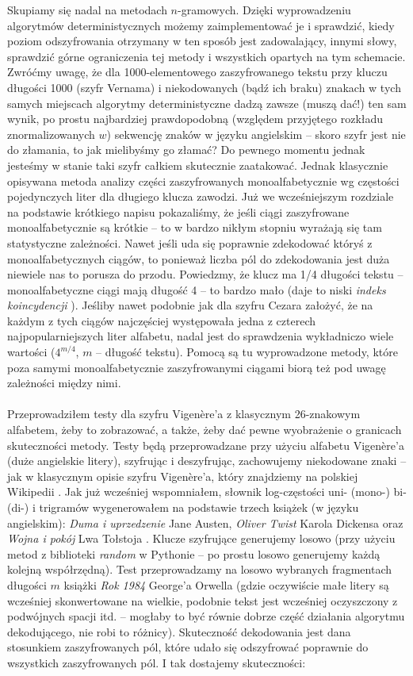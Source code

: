 \documentclass[a4paper]{article}
\theoremstyle{defn}
\theoremstyle{theorem}
\theoremstyle{lemma}
\theoremstyle{cor}
\theoremstyle{fact}
\begin{document}
Skupiamy się nadal na metodach $n$-gramowych. Dzięki wyprowadzeniu algorytmów deterministycznych możemy zaimplementować je i sprawdzić, kiedy poziom odszyfrowania otrzymany w ten sposób jest zadowalający, innymi słowy, sprawdzić górne ograniczenia tej metody i wszystkich opartych na tym schemacie. Zwróćmy uwagę, że dla 1000-elementowego zaszyfrowanego tekstu przy kluczu długości 1000 (szyfr Vernama) i niekodowanych (bądź ich braku) znakach w tych samych miejscach algorytmy deterministyczne dadzą zawsze (muszą dać!) ten sam wynik, po prostu najbardziej prawdopodobną (względem przyjętego rozkładu znormalizowanych $w$) sekwencję znaków w języku angielskim – skoro szyfr jest nie do złamania, to jak mielibyśmy go złamać? Do pewnego momentu jednak jesteśmy w stanie taki szyfr całkiem skutecznie zaatakować. Jednak klasycznie opisywana metoda analizy części zaszyfrowanych monoalfabetycznie wg częstości pojedynczych liter dla długiego klucza zawodzi. Już we wcześniejszym rozdziale na podstawie krótkiego napisu pokazaliśmy, że jeśli ciągi zaszyfrowane monoalfabetycznie są krótkie – to w bardzo nikłym stopniu wyrażają się tam statystyczne zależności. Nawet jeśli uda się poprawnie zdekodować któryś z monoalfabetycznych ciągów, to ponieważ liczba pól do zdekodowania jest duża niewiele nas to porusza do przodu. Powiedzmy, że klucz ma 1/4 długości tekstu – monoalfabetyczne ciągi mają długość 4 – to bardzo mało (daje to niski \textit{indeks koincydencji} \cite{coinc}). Jeśliby nawet podobnie jak dla szyfru Cezara założyć, że na każdym z tych ciągów najczęściej występowała jedna z czterech najpopularniejszych liter alfabetu, nadal jest do sprawdzenia wykładniczo wiele wartości ($4^{m/4}$, $m$ – długość tekstu). Pomocą są tu wyprowadzone metody, które poza samymi monoalfabetycznie zaszyfrowanymi ciągami biorą też pod uwagę zależności między nimi. \\\\
Przeprowadziłem testy dla szyfru Vigenère'a z klasycznym 26-znakowym alfabetem, żeby to zobrazować, a także, żeby dać pewne wyobrażenie o granicach skuteczności metody. Testy będą przeprowadzane przy użyciu alfabetu Vigenère'a (duże angielskie litery), szyfrując i deszyfrując, zachowujemy niekodowane znaki – jak w klasycznym opisie szyfru Vigenère'a, który znajdziemy na polskiej Wikipedii \cite{vigenere}. Jak już wcześniej wspomniałem, słownik log-częstości uni- (mono-) bi- (di-) i trigramów wygenerowałem na podstawie trzech książek (w języku angielskim): \textit{Duma i uprzedzenie} Jane Austen, \textit{Oliver Twist} Karola Dickensa oraz \textit{Wojna i pokój} Lwa Tołstoja \cite{gutenberg}. Klucze szyfrujące generujemy losowo (przy użyciu metod z biblioteki \textit{random} w Pythonie – po prostu losowo generujemy każdą kolejną współrzędną). Test przeprowadzamy na losowo wybranych fragmentach długości $m$ książki \textit{Rok 1984} George'a Orwella (gdzie oczywiście małe litery są wcześniej skonwertowane na wielkie, podobnie tekst jest wcześniej oczyszczony z podwójnych spacji itd. – mogłaby to być równie dobrze część działania algorytmu dekodującego, nie robi to różnicy). Skuteczność dekodowania jest dana stosunkiem zaszyfrowanych pól, które udało się odszyfrować poprawnie do wszystkich zaszyfrowanych pól. I tak dostajemy skuteczności:\\
\end{document}
